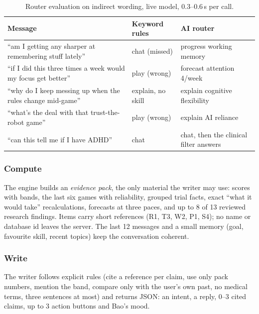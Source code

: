 \documentclass[11pt,a4paper]{article}
\begin{document}
\begin{table}[H]
\centering\small
\caption{Router evaluation on indirect wording, live model, 0.3--0.6\,s per call.}
\label{tab:router}
\begin{tabularx}{\linewidth}{@{}X >{\raggedright}p{3.2cm} >{\raggedright\arraybackslash}p{4.6cm}@{}}
\toprule
Message & Keyword rules & AI router\\
\midrule
``am I getting any sharper at remembering stuff lately'' & chat (missed) & progress \textperiodcentered{} working memory\\
``if I did this three times a week would my focus get better'' & play (wrong) & forecast \textperiodcentered{} attention \textperiodcentered{} 4/week\\
``why do I keep messing up when the rules change mid-game'' & explain, no skill & explain \textperiodcentered{} cognitive flexibility\\
``what's the deal with that trust-the-robot game'' & play (wrong) & explain \textperiodcentered{} AI reliance\\
``can this tell me if I have ADHD'' & chat & chat, then the clinical filter answers\\
\bottomrule
\end{tabularx}
\end{table}

\subsubsection{Compute} The engine builds an \emph{evidence pack}, the only material the writer may use: scores with bands, the last six games with reliability, grouped trial facts, exact ``what it would take'' recalculations, forecasts at three paces, and up to 8 of 13 reviewed research findings. Items carry short references (R1, T3, W2, P1, S4); no name or database id leaves the server. The last 12 messages and a small memory (goal, favourite skill, recent topics) keep the conversation coherent.

\subsubsection{Write} The writer follows explicit rules (cite a reference per claim, use only pack numbers, mention the band, compare only with the user's own past, no medical terms, three sentences at most) and returns JSON: an intent, a reply, 0--3 cited claims, up to 3 action buttons and Bao's mood.
\end{document}
